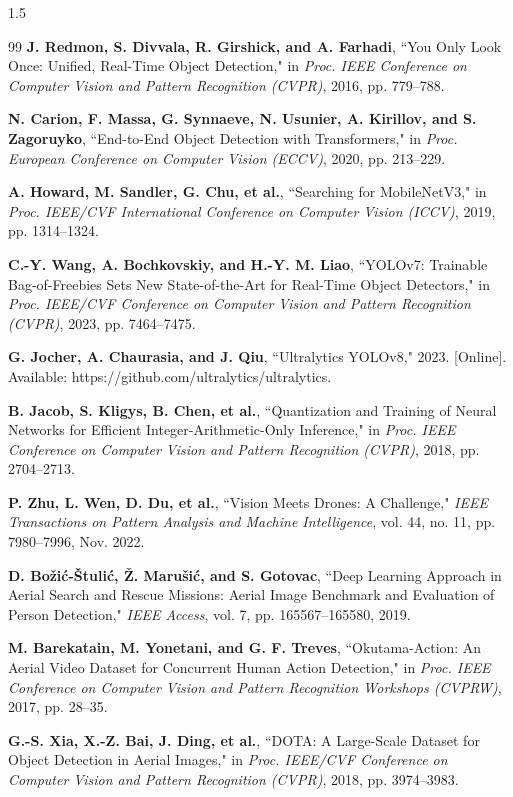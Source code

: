 \begin{spacing}{1.5}
\begin{thebibliography}{99}
 \textbf{J. Redmon, S. Divvala, R. Girshick, and A. Farhadi}, ``You Only Look Once: Unified, Real-Time Object Detection," in \textit{Proc. IEEE Conference on Computer Vision and Pattern Recognition (CVPR)}, 2016, pp. 779--788.

 \textbf{N. Carion, F. Massa, G. Synnaeve, N. Usunier, A. Kirillov, and S. Zagoruyko}, ``End-to-End Object Detection with Transformers," in \textit{Proc. European Conference on Computer Vision (ECCV)}, 2020, pp. 213--229.

 \textbf{A. Howard, M. Sandler, G. Chu, et al.}, ``Searching for MobileNetV3," in \textit{Proc. IEEE/CVF International Conference on Computer Vision (ICCV)}, 2019, pp. 1314--1324.

 \textbf{C.-Y. Wang, A. Bochkovskiy, and H.-Y. M. Liao}, ``YOLOv7: Trainable Bag-of-Freebies Sets New State-of-the-Art for Real-Time Object Detectors," in \textit{Proc. IEEE/CVF Conference on Computer Vision and Pattern Recognition (CVPR)}, 2023, pp. 7464--7475.

 \textbf{G. Jocher, A. Chaurasia, and J. Qiu}, ``Ultralytics YOLOv8," 2023. [Online]. Available: https://github.com/ultralytics/ultralytics.

 \textbf{B. Jacob, S. Kligys, B. Chen, et al.}, ``Quantization and Training of Neural Networks for Efficient Integer-Arithmetic-Only Inference," in \textit{Proc. IEEE Conference on Computer Vision and Pattern Recognition (CVPR)}, 2018, pp. 2704--2713.

 \textbf{P. Zhu, L. Wen, D. Du, et al.}, ``Vision Meets Drones: A Challenge," \textit{IEEE Transactions on Pattern Analysis and Machine Intelligence}, vol. 44, no. 11, pp. 7980--7996, Nov. 2022.

 \textbf{D. Bo\v{z}i\'{c}-Štuli\'{c}, Ž. Maruši\'{c}, and S. Gotovac}, ``Deep Learning Approach in Aerial Search and Rescue Missions: Aerial Image Benchmark and Evaluation of Person Detection," \textit{IEEE Access}, vol. 7, pp. 165567--165580, 2019.

 \textbf{M. Barekatain, M. Yonetani, and G. F. Treves}, ``Okutama-Action: An Aerial Video Dataset for Concurrent Human Action Detection," in \textit{Proc. IEEE Conference on Computer Vision and Pattern Recognition Workshops (CVPRW)}, 2017, pp. 28--35.

 \textbf{G.-S. Xia, X.-Z. Bai, J. Ding, et al.}, ``DOTA: A Large-Scale Dataset for Object Detection in Aerial Images," in \textit{Proc. IEEE/CVF Conference on Computer Vision and Pattern Recognition (CVPR)}, 2018, pp. 3974--3983.


\end{thebibliography}
\end{spacing}
